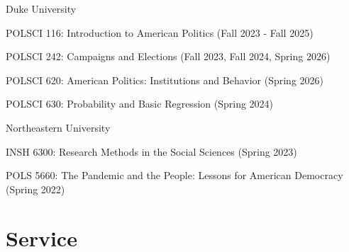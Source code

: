 \documentclass[letterpaper]{article}
\renewenvironment{itemize}{
  \begin{list}{}{
    \setlength{\leftmargin}{1.5em}
  }
}{
  \end{list}
}
\begin{document}
\begin{itemize}

\item Duke University
	\begin{itemize}
	\item POLSCI 116: Introduction to American Politics (Fall 2023 - Fall 2025)
	\item POLSCI 242: Campaigns and Elections (Fall 2023, Fall 2024, Spring 2026)
	\item POLSCI 620: American Politics: Institutions and Behavior (Spring 2026)
	\item POLSCI 630: Probability and Basic Regression (Spring 2024)
	\end{itemize}

\item Northeastern University 
	\begin{itemize}
	\item INSH 6300: Research Methods in the Social Sciences (Spring 2023)
	\item POLS 5660: The Pandemic and the People: Lessons for American Democracy (Spring 2022)
	\end{itemize}
\end{itemize}




\section*{Service}
\end{document}
